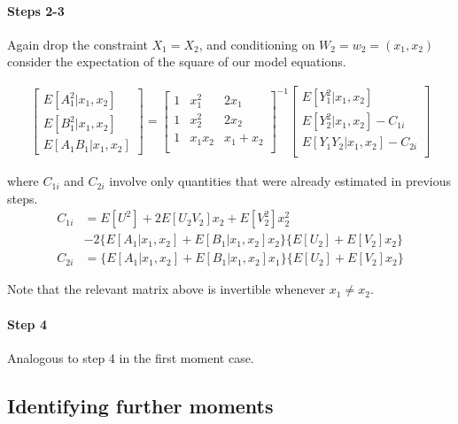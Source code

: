 \paragraph{Steps 2-3} Again drop the constraint $X_1 = X_2$, and conditioning on $W_2 = w_2 = (x_1, x_2)$ consider the expectation of the square of our model equations.

\begin{align}
\begin{bmatrix}
  E[A_1^2 | x_{1}, x_{2}] \\ 
  E[B_1^2 | x_{1}, x_{2}]  \\ 
  E[A_1 B_1 | x_{1}, x_{2}]
\end{bmatrix}
=
\begin{bmatrix}
  1 & x_{1}^2 & 2x_{1} \\ 
  1 & x_{2}^2 & 2x_{2} \\ 
  1 & x_{1}x_{2} & x_{1} + x_{2} \\ 
\end{bmatrix}^{-1}
\begin{bmatrix}
  E[Y_1^2 | x_{1}, x_{2}] \\
  E[Y_2^2 | x_{1}, x_{2}] - C_{1i} \\
  E[Y_1 Y_2 | x_{1}, x_{2}] - C_{2i} \\
\end{bmatrix}
\end{align}

\noindent where $C_{1i}$ and $C_{2i}$ involve only quantities that were already estimated in previous steps.
\begin{align}
C_{1i} &= E[U^2] + 2E[U_2 V_2] x_{2} +  E[V_2^2]x_{2}^2 \\
      &- 2\{
E[A_1 | x_{1}, x_{2}] +
E[B_1 | x_{1}, x_{2}]x_{2}
\}
\{
E[U_2] + E[V_2]x_{2}
\}
\\
C_{2i} &= 
\{ 
  E[A_1 | x_{1}, x_{2}] + E[B_1 | x_{1}, x_{2}]x_{1}
\}
\{
E[U_2] + E[V_2]x_{2}
\}
\end{align}

Note that the relevant matrix above is invertible whenever $x_1 \neq x_2$. 

\paragraph{Step 4} Analogous to step 4 in the first moment case.


\subsection{Identifying further moments}

